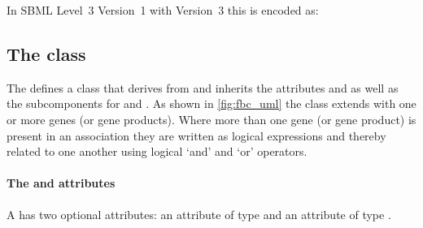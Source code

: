 In SBML Level~3 Version~1 with \FBC Version~3 this is encoded as:
%

%
%
%

%


%

%


\subsection{The \FBC {} class}
\label{geneproductassociation-class}

The \FBCPackage defines a \GeneProductAssociation class that derives
from \SBase and inherits the attributes  and 
as well as the subcomponents for \Annotation and \Notes. As shown in
\ref{fig:fbc_uml} the \GeneProductAssociation class extends \Reaction with
one or more genes (or gene products). Where more than one gene (or gene product) is present in an association they are written as logical expressions and thereby related to one another using logical `and' and `or' operators.

\paragraph{The  and  attributes}
A \GeneProductAssociation has two optional attributes:  an attribute of
type  and  an attribute of type .


